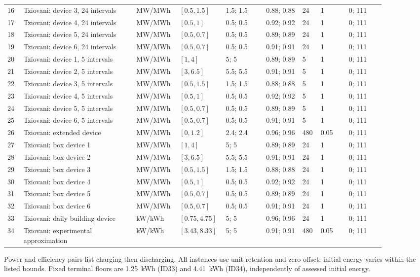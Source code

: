 \begin{landscape}
\begin{longtable}{@{}p{0.045\linewidth}p{0.28\linewidth}p{0.09\linewidth}p{0.09\linewidth}p{0.1\linewidth}p{0.09\linewidth}p{0.04\linewidth}p{0.07\linewidth}p{0.09\linewidth}@{}}
16 & Tziovani: device 3, 24 intervals & MW/MWh & $[0.5,1.5]$ & 1.5; 1.5 & 0.88; 0.88 & 24 & 1 & 0; 111\\
17 & Tziovani: device 4, 24 intervals & MW/MWh & $[0.5,1]$ & 0.5; 0.5 & 0.92; 0.92 & 24 & 1 & 0; 111\\
18 & Tziovani: device 5, 24 intervals & MW/MWh & $[0.5,0.7]$ & 0.5; 0.5 & 0.89; 0.89 & 24 & 1 & 0; 111\\
19 & Tziovani: device 6, 24 intervals & MW/MWh & $[0.5,0.7]$ & 0.5; 0.5 & 0.91; 0.91 & 24 & 1 & 0; 111\\
20 & Tziovani: device 1, 5 intervals & MW/MWh & $[1,4]$ & 5; 5 & 0.89; 0.89 & 5 & 1 & 0; 111\\
21 & Tziovani: device 2, 5 intervals & MW/MWh & $[3,6.5]$ & 5.5; 5.5 & 0.91; 0.91 & 5 & 1 & 0; 111\\
22 & Tziovani: device 3, 5 intervals & MW/MWh & $[0.5,1.5]$ & 1.5; 1.5 & 0.88; 0.88 & 5 & 1 & 0; 111\\
23 & Tziovani: device 4, 5 intervals & MW/MWh & $[0.5,1]$ & 0.5; 0.5 & 0.92; 0.92 & 5 & 1 & 0; 111\\
24 & Tziovani: device 5, 5 intervals & MW/MWh & $[0.5,0.7]$ & 0.5; 0.5 & 0.89; 0.89 & 5 & 1 & 0; 111\\
25 & Tziovani: device 6, 5 intervals & MW/MWh & $[0.5,0.7]$ & 0.5; 0.5 & 0.91; 0.91 & 5 & 1 & 0; 111\\
26 & Tziovani: extended device & MW/MWh & $[0,1.2]$ & 2.4; 2.4 & 0.96; 0.96 & 480 & 0.05 & 0; 111\\
27 & Tziovani: box device 1 & MW/MWh & $[1,4]$ & 5; 5 & 0.89; 0.89 & 24 & 1 & 0; 111\\
28 & Tziovani: box device 2 & MW/MWh & $[3,6.5]$ & 5.5; 5.5 & 0.91; 0.91 & 24 & 1 & 0; 111\\
29 & Tziovani: box device 3 & MW/MWh & $[0.5,1.5]$ & 1.5; 1.5 & 0.88; 0.88 & 24 & 1 & 0; 111\\
30 & Tziovani: box device 4 & MW/MWh & $[0.5,1]$ & 0.5; 0.5 & 0.92; 0.92 & 24 & 1 & 0; 111\\
31 & Tziovani: box device 5 & MW/MWh & $[0.5,0.7]$ & 0.5; 0.5 & 0.89; 0.89 & 24 & 1 & 0; 111\\
32 & Tziovani: box device 6 & MW/MWh & $[0.5,0.7]$ & 0.5; 0.5 & 0.91; 0.91 & 24 & 1 & 0; 111\\
33 & Tziovani: daily building device & kW/kWh & $[0.75,4.75]$ & 5; 5 & 0.96; 0.96 & 24 & 1 & 0; 111\\
34 & Tziovani: experimental approximation & kW/kWh & $[3.43,8.33]$ & 5; 5 & 0.91; 0.91 & 480 & 0.05 & 0; 111\\
\end{longtable}
 Power and efficiency pairs list charging then discharging. All instances use unit retention and zero offset; initial energy varies within the listed bounds. Fixed terminal floors are 1.25~kWh (ID33) and 4.41~kWh (ID34), independently of assessed initial energy.
\endgroup
\end{landscape}



